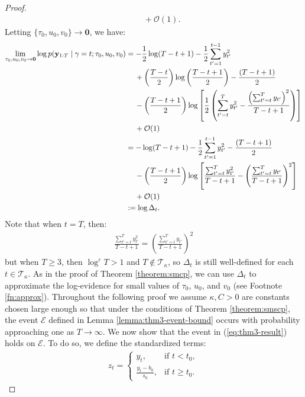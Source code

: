\begin{proof}
\begin{align*}
    &\quad\:+ \mathcal{O}(1).
\end{align*}
\normalsize
Letting $\{\tau_0,u_0, v_0\} \to \mathbf{0}$, we have:
\small
\begin{align}
    \lim_{\tau_0,u_0, v_0 \to \mathbf{0}}\log p(\mathbf{y}_{1:T} \;|\; \gamma = t; \tau_0,u_0,v_0) &= -\frac{1}{2}\log(T - t + 1) - \frac{1}{2}\sum_{t'=1}^{t-1} y_{t'}^2  \notag \\
    &\quad\: + \left(\frac{T-t}{2}\right) \log \left(\frac{T-t+1}{2}\right) - \frac{(T-t+1)}{2}  \notag\\
    &\quad\: - \left(\frac{T - t +1}{2}\right)\log\left[\frac{1}{2}\left(\sum_{t'=t}^T y_{t'}^2 - \frac{\left(\sum_{t'=t}^T y_{t'}\right)^2}{T- t +1}\right) \right] \notag \\
    &\quad\:+ \mathcal{O}(1)\notag \\
    &= -\log(T - t + 1) - \frac{1}{2}\sum_{t'=1}^{t-1} y_{t'}^2  - \frac{(T-t+1)}{2}  \notag\\
    &\quad\: - \left(\frac{T - t +1}{2}\right)\log\left[\frac{\sum_{t'=t}^T y_{t'}^2}{T-t+1} - \left(\frac{\sum_{t'=t}^T y_{t'}}{T-t+1}\right)^2 \right] \notag \\
    &\quad\:+ \mathcal{O}(1)\notag \\
    &:= \log \Delta_t. \label{eq:thm3-delta_t}
\end{align}
\normalsize
Note that when $t = T$, then:
\begin{align*}
    \frac{\sum_{t'=t}^T y_{t'}^2}{T-t+1} = \left(\frac{\sum_{t'=t}^T y_{t'}}{T-t+1}\right)^2  
\end{align*}
but when $T \geq 3$, then $\log^\varepsilon T > 1$ and $T \not\in \mathcal{T}_\kappa$, so $\Delta_t$ is still well-defined for each $t\in\mathcal{T}_\kappa$. As in the proof of Theorem \ref{theorem:smcp}, we can use $\Delta_t$ to approximate the log-evidence for small values of $\tau_0$, $u_0$, and $v_0$ (see Footnote \ref{fn:approx}). Throughout the following proof we assume $\kappa,C >0$ are constants chosen large enough so that under the conditions of Theorem \ref{theorem:smscp}, the event $\mathcal{E}$ defined in Lemma \ref{lemma:thm3-event-bound} occurs with probability approaching one as $T\to\infty$. We now show that the event in (\ref{eq:thm3-result}) holds on $\mathcal{E}$. To do so, we define the standardized terms: 
\begin{align*}
    z_t = 
    \begin{cases}
        y_t, & \text{if } t < t_0, \\
        \frac{y_t - b_0}{s_0},& \text{if } t \geq t_0.

\end{cases}
\end{align*}
\end{proof}
